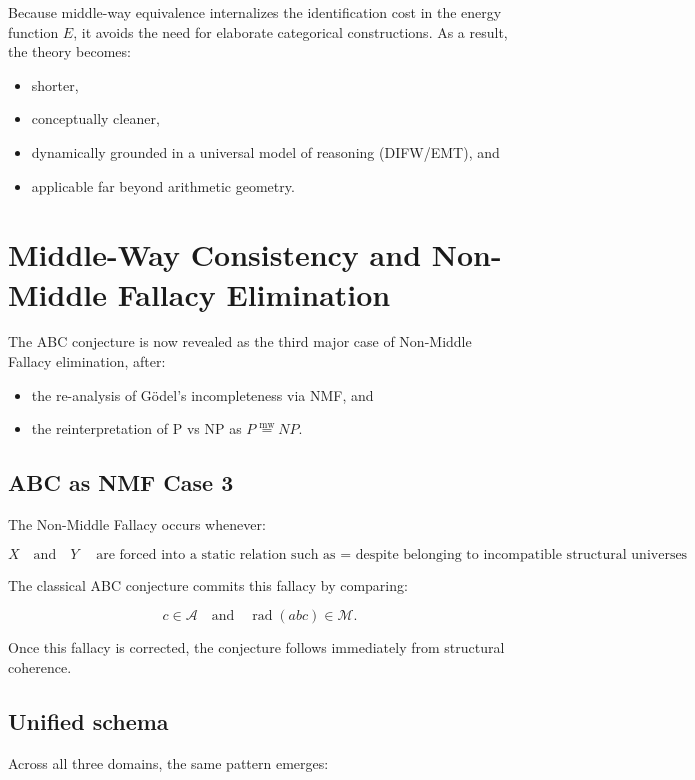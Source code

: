 \documentclass[11pt]{article}
\newcommand{\mweq}{\mathrel{\overset{\mathrm{mw}}{=}}}
\theoremstyle{definition}
\theoremstyle{remark}
\begin{document}
Because middle-way equivalence internalizes the identification cost in
the energy function $E$, it avoids the need for elaborate categorical
constructions. As a result, the theory becomes:

\begin{itemize}
  \item shorter,
  \item conceptually cleaner,
  \item dynamically grounded in a universal model of reasoning
        (DIFW/EMT), and
  \item applicable far beyond arithmetic geometry.
\end{itemize}

\section{Middle-Way Consistency and Non-Middle Fallacy Elimination}

The ABC conjecture is now revealed as the third major case of
Non-Middle Fallacy elimination, after:

\begin{itemize}
  \item the re-analysis of G\"odel's incompleteness via NMF, and
  \item the reinterpretation of P vs NP as $P \mweq NP$.
\end{itemize}

\subsection{ABC as NMF Case 3}

The Non-Middle Fallacy occurs whenever:

\[
  X \quad\text{and}\quad Y
  \quad\text{are forced into a static relation such as $=$ despite
  belonging to incompatible structural universes}.
\]

The classical ABC conjecture commits this fallacy by comparing:

\[
  c \in \mathcal{A}
  \quad\text{and}\quad
  \operatorname{rad}(abc) \in \mathcal{M}.
\]

Once this fallacy is corrected, the conjecture follows immediately from
structural coherence.

\subsection{Unified schema}

Across all three domains, the same pattern emerges:
\end{document}
